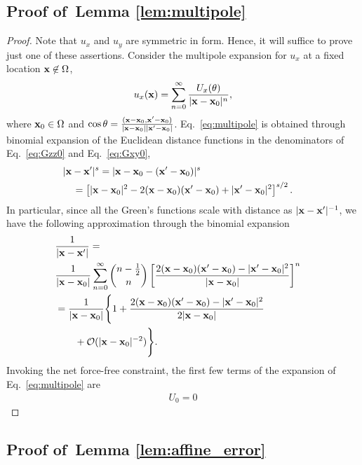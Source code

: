 \documentclass[aps,prl,reprint,twocolumn,groupedaddress,showpacs]{revtex4-1}
\def\x{{\bf x}}
\begin{document}
\subsection{Proof of~Lemma \ref{lem:multipole}}

\begin{proof}
Note that $u_x$ and $u_y$ are symmetric in form. Hence, it will suffice to prove just one of these assertions. Consider the multipole expansion for $u_x$ at a fixed location $\x\not\in\Omega$, 
\begin{align}
u_x(\x) =\sum_{n=0}^\infty \frac{U_x(\theta)}{|\x - \x_0|^n}, \label{eq:multipole}
\end{align}
where $\x_0\in\Omega$ and $\cos\theta = \frac{(\x-\x_0,\x'-\x_0)} {|\x - \x_0| |\x'-\x_0|}$. Eq.~\ref{eq:multipole}  is obtained through binomial expansion of the Euclidean distance functions in the denominators of Eq.~\ref{eq:Gzz0} and Eq.~\ref{eq:Gxy0},
\begin{align*}
\lefteqn{|\x - \x'|^s = |\x-\x_0 - (\x'-\x_0) |^s }\\
&\quad= \left[ |\x-\x_0|^2 -2 (\x-\x_0)(\x'-\x_0) + |\x'-\x_0|^2  \right]^{s/2}.
\end{align*}
In particular, since all the Green's functions scale with distance as $|\x-\x'|^{-1}$, we have the following approximation through the binomial expansion
\begin{align}
\lefteqn{\frac{1}{|\x-\x'|} =} \nonumber\\
&  \frac{1}{|\x-\x_0|}\sum_{n=0}^\infty {n-\frac{1}{2} \choose n} \left[  \frac{2 (\x-\x_0)(\x'-\x_0) - |\x'-\x_0|^2 }{|\x-\x_0|} \right]^n \nonumber\\
&=\frac{1}{|\x-\x_0|}\Bigg\{ 1 +    \frac{2 (\x-\x_0)(\x'-\x_0) - |\x'-\x_0|^2 }{2|\x-\x_0|}    \nonumber\\
&\qquad+ \mathcal{O}(|\x-\x_0|^{-2})\Bigg\}.
\end{align}
Invoking the net force-free constraint, the first few terms of the expansion of Eq.~\ref{eq:multipole} are
\begin{align}
U_0 = 0
\end{align}
\end{proof}
      
\subsection{Proof of~Lemma \ref{lem:affine_error}}


\end{document}

